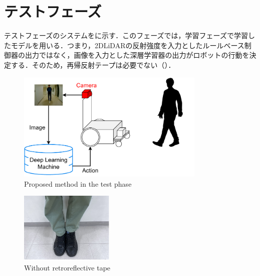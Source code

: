 
\section{テストフェーズ}

  テストフェーズのシステムをに示す．このフェーズでは，学習フェーズで学習したモデルを用いる．つまり，2DLiDARの反射強度を入力としたルールベース制御器の出力ではなく，画像を入力とした深層学習器の出力がロボットの行動を決定する．そのため，再帰反射テープは必要でない（）．

  \vspace{0.5cm}

  \begin{figure}[h]
    \centering
    \includegraphics[width=9cm] {images/pdf/RobotGuidance_test_system}
    \captionsetup{justification=raggedright} %
    \caption{Proposed method in the test phase}
    \label{Fig:RobotGuidance_following_system}
  \end{figure}

  \vspace{0.5cm}

  \begin{figure}[h]
    \centering
    \includegraphics[width=4.5cm] {images/pdf/RobotGuidance_test_phase_leg}
    \captionsetup{justification=raggedright} %
    \caption{Without retroreflective tape}
    \label{Fig:RobotGuidance_following_phase_leg}
  \end{figure}

\newpage
